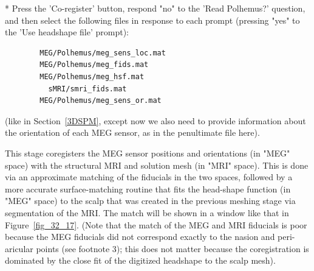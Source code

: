* Press the 'Co-register' button, respond "no" to the 'Read Polhemus?' question, and then select the following files in response to each prompt (pressing "yes" to the 'Use headshape file' prompt):
\begin{verbatim}
  		MEG/Polhemus/meg_sens_loc.mat
   		MEG/Polhemus/meg_fids.mat
   		MEG/Polhemus/meg_hsf.mat   		
		  sMRI/smri_fids.mat
  		MEG/Polhemus/meg_sens_or.mat
\end{verbatim}
	(like in Section~\ref{3DSPM}, except now we also need to provide information about the orientation of each MEG sensor, as in the penultimate file here).

This stage coregisters the MEG sensor positions and orientations (in "MEG" space) with the structural MRI and solution mesh (in "MRI" space). This is done via an approximate matching of the fiducials in the two spaces, followed by a more accurate surface-matching routine that fits the head-shape function (in "MEG" space) to the scalp that was created in the previous meshing stage via segmentation of the MRI. The match will be shown in a window like that in Figure~\ref{fig_32_17}. (Note that the match of the MEG and MRI fiducials is poor because the MEG fiducials did not correspond exactly to the nasion and peri-aricular points (see footnote 3); this does not matter because the coregistration is dominated by the close fit of the digitized headshape to the scalp mesh).

